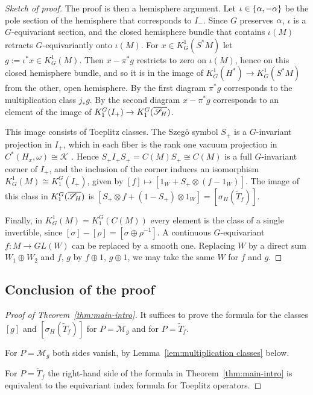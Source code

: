 \documentclass[11pt]{amsart}
\theoremstyle{plain}
\theoremstyle{definition}
\theoremstyle{remark}
\begin{document}
\begin{proof}[Sketch of proof]
The proof is then a hemisphere argument.
Let $\iota\in\{\alpha,-\alpha\}$ be the pole section of the hemisphere that corresponds to $I_-$.
Since $G$ preserves $\alpha$, $\iota$ is a $G$-equivariant section, and the closed hemisphere bundle that contains $\iota(M)$ retracts $G$-equivariantly onto $\iota(M)$.
For $x\in K^1_G(S^*M)$ let $g:=\iota^*x\in K^1_G(M)$.
Then $x-\pi^*g$ restricts to zero on $\iota(M)$, hence on this closed hemisphere bundle, and so it is in the image of $K^1_G(H^*)\to K^1_G(S^*M)$ from the other, open hemisphere.
By the first diagram $\pi^*g$ corresponds to the multiplication class $j_*g$.
By the second diagram $x-\pi^*g$ corresponds to an element of the image of $K_1^G(I_+)\to K_1^G(\overline{{\mathscr{S}_H}})$.

This image consists of Toeplitz classes.
The Szeg\"o symbol $S_+$ is a $G$-invariant projection in $I_+$, which in each fiber is the rank one vacuum projection in $C^*(H_x,\omega)\cong\mathcal K$ \cite[Section~3.6]{GvE26}.
Hence $S_+I_+S_+=C(M)S_+\cong C(M)$ is a full $G$-invariant corner of $I_+$, and the inclusion of the corner induces an isomorphism $K^1_G(M)\cong K_1^G(I_+)$, given by $[f]\mapsto[1_W+S_+\otimes(f-1_W)]$.
The image of this class in $K_1^G(\overline{{\mathscr{S}_H}})$ is $[S_+\otimes f+(1-S_+)\otimes1_W]=[\sigma_H(\tilde T_f)]$.

Finally, in $K^1_G(M)=K_1^G(C(M))$  every element is the class of a single invertible, since $[\sigma]-[\rho]=[\sigma\oplus\rho^{-1}]$.
A continuous $G$-equivariant $f:M\to GL(W)$ can be replaced by a smooth one.
Replacing $W$ by a direct sum $W_1\oplus W_2$ and $f$, $g$ by $f\oplus1$, $g\oplus1$, we may take the same $W$ for $f$ and $g$.

\end{proof}

\subsection{Conclusion of the proof}\label{sec:conclusion}




\begin{proof}[Proof of Theorem~\ref{thm:main-intro}]
It suffices to prove the formula for the classes $[g]$ and $[\sigma_H(\tilde T_f)]$ for $P=\mathcal M_g$ and for $P=\tilde T_f$.

For $P=\mathcal M_g$ both sides vanish, by Lemma~\ref{lem:multiplication classes} below.

For $P=\tilde T_f$  the right-hand side of the formula in Theorem~\ref{thm:main-intro}
is equivalent to the equivariant index formula for Toeplitz operators.

\end{proof}
\end{document}
